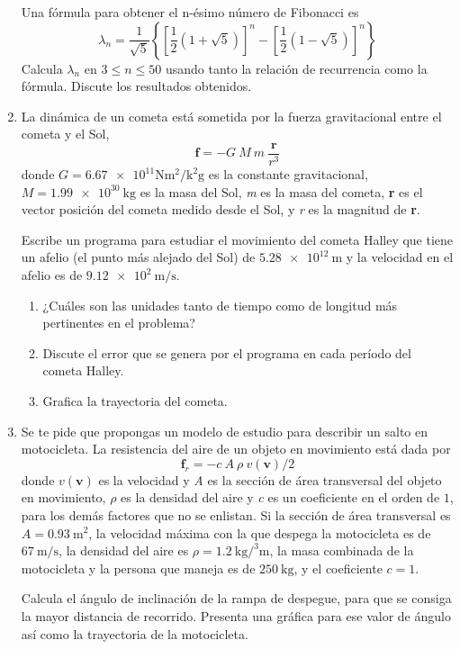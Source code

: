 \begin{enumerate}
Una fórmula para obtener el n-ésimo número de Fibonacci es
\[ \lambda_{n} = \dfrac{1}{\sqrt{5}} \left\lbrace \left[ \dfrac{1}{2} (1 + \sqrt{5}) \right]^{n} - \left[ \dfrac{1}{2} (1 - \sqrt{5}) \right]^{n} \right\rbrace \]
Calcula $\lambda_{n}$ en $3\leq n \leq 50$ usando tanto la relación de recurrencia como la fórmula. Discute los resultados obtenidos.
\item La dinámica de un cometa está sometida por la fuerza gravitacional entre el cometa y el Sol, 
\[ \textbf{f} = -G \: M \: m \:  \dfrac{\textbf{r}}{r^{3}} \]
donde $ G= \num{6.67e11} \si{\newton\square\meter\per\square\kilo\gram}$ es la constante gravitacional, $M = \SI{1.99e30}{\kilo\gram}$ es la masa del Sol, \textit{m} es la masa del cometa, \textbf{r} es el vector posición del cometa medido desde el Sol, y \textit{r} es la magnitud de \textbf{r}.
\par
Escribe un programa para estudiar el movimiento del cometa Halley que tiene un afelio (el punto más alejado del Sol) de $\SI{5.28e12}{\meter}$ y la velocidad en el afelio es de $\SI{9.12e2}{\meter\per\second}$.
\begin{enumerate}
\item ¿Cuáles son las unidades tanto de tiempo como de longitud más pertinentes en el problema?
\item Discute el error que se genera por el programa en cada período del cometa Halley.
\item Grafica la trayectoria del cometa.
\end{enumerate}
\item Se te pide que propongas un modelo de estudio para describir un salto en motocicleta. La resistencia del aire de un objeto en movimiento está dada por 
\[ \textbf{f}_{r} = - c \: A \: \rho \: v(\textbf{v})/2 \]
donde $v(\textbf{v})$ es la velocidad y \textit{A} es la sección de área transversal del objeto en movimiento, $\rho$ es la densidad del aire y \textit{c} es un coeficiente en el orden de $1$, para los demás factores que no se enlistan. Si la sección de área transversal es $A = \SI{0.93}{\square\meter}$, la velocidad máxima con la que despega la motocicleta es de $\SI{67}{\meter\per\second}$, la densidad del aire es $\rho = \SI{1.2}{\kilo\gram\per\cubed\meter}$, la masa combinada de la motocicleta y la persona que maneja es de $\SI{250}{\kilo\gram}$, y el coeficiente $c = 1$.
\par
Calcula el ángulo de inclinación de la rampa de despegue, para que se consiga la mayor distancia de recorrido. Presenta una gráfica para ese valor de ángulo así como la trayectoria de la motocicleta.

\end{enumerate}
